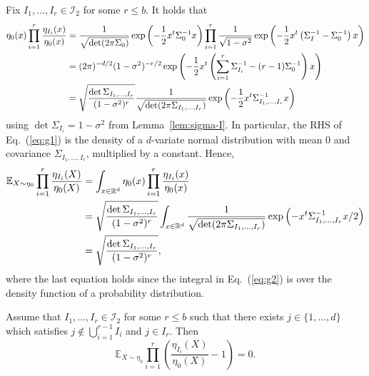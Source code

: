 \documentclass[final, 12pt]{colt2018}
\renewcommand{\eqref}[1]{Eq.~(\ref{#1})}
\begin{document}
Fix $I_1, \dots, I_r \in \mathcal{I}_2$ for some $r \le b$. It holds that
\begin{align}
\eta_0(x) \prod_{i=1}^r \frac{\eta_{I_i}(x)}{\eta_0(x)}
&= \frac{1}{\sqrt{\det(2 \pi \Sigma_0)}} \exp\left(-\frac{1}{2}x^t \Sigma_0^{-1} x\right) \prod_{i=1}^r \frac{1}{\sqrt{1-\sigma^2}} 
\exp \left( -\frac{1}{2}x^t \left( \Sigma_I^{-1} - \Sigma_0^{-1} \right) x \right)\label{eq:g1}\\
&= (2\pi)^{-d/2} (1-\sigma^2)^{-r/2} \exp \left(-\frac{1}{2} x^t \left( \sum_{i=1}^r\Sigma_{I_i}^{-1} - (r-1)\Sigma_0^{-1} \right)x\right) \notag\\
&= \sqrt{\frac{\det \Sigma_{I_1, \dots, I_r}}{(1-\sigma^2)^r}} \frac{1}{\sqrt{\det(2 \pi \Sigma_{I_1,\dots,I_r})}} \exp \left(- \frac{1}{2}x^t \Sigma_{I_1,\dots,I_r}^{-1}x\right) \label{eq:prod-gaus}
\end{align}
using $\det \Sigma_{I_i} = 1-\sigma^2$ from Lemma~\ref{lem:sigma-I}. In particular, the RHS of \eqref{eq:g1} is the density of a $d$-variate normal distribution with mean  $0$ and covariance $\Sigma_{I_1,\dots,I_r}$, multiplied by a constant. Hence,
\begin{align}
\mathbb{E}_{X \sim \eta_0} \prod_{i=1}^r \frac{\eta_{I_i}(X)}{\eta_0(X)}
&= \int_{x \in \mathbb{R}^d} \eta_0(x) \prod_{i=1}^r \frac{\eta_{I_i}(x)}{\eta_0(x)} \notag\\
&= \sqrt{\frac{\det \Sigma_{I_1, \dots, I_r}}{(1-\sigma^2)^r}} \int_{x \in \mathbb{R}^d} \frac{1}{\sqrt{\det(2 \pi \Sigma_{I_1,\dots,I_r})}} \exp \left(- x^t \Sigma_{I_1,\dots,I_r}^{-1}x / 2 \right) \label{eq:g2}\\
&=\sqrt{\frac{\det \Sigma_{I_1, \dots, I_r}}{(1-\sigma^2)^r}},\label{eq:g5}
\end{align}
where the last equation holds since the integral in \eqref{eq:g2} is over the density function of a probability distribution.

\begin{lemma} \label{lem:gzero}
Assume that $I_1,\dots, I_r \in \mathcal{I}_2$ for some $r \le b$ such that there exists $j \in \{1,\dots,d\}$ which satisfies $j \notin \bigcup_{i=1}^{r-1} I_i$ and $j \in I_r$. Then
\begin{equation} \label{eq:g9}
\mathbb{E}_{X\sim \eta_0} \prod_{i=1}^{r} \left( \frac{\eta_{I_i}(X)}{\eta_0(X)}-1 \right)
= 0.
\end{equation}
\end{lemma}
\end{document}
